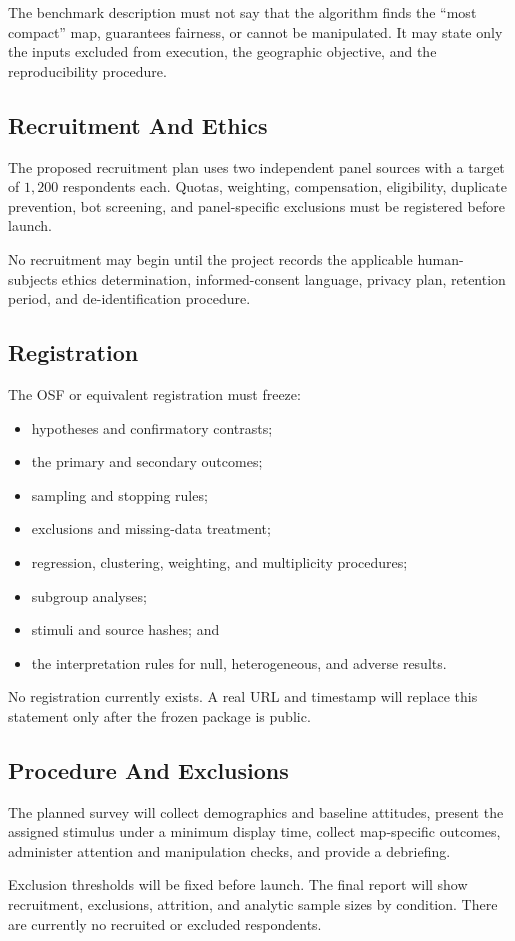 The benchmark description must not say that the algorithm finds the ``most
compact'' map, guarantees fairness, or cannot be manipulated. It may state only
the inputs excluded from execution, the geographic objective, and the
reproducibility procedure.

\subsection{Recruitment And Ethics}

The proposed recruitment plan uses two independent panel sources with a target
of $1{,}200$ respondents each. Quotas, weighting, compensation, eligibility,
duplicate prevention, bot screening, and panel-specific exclusions must be
registered before launch.

No recruitment may begin until the project records the applicable
human-subjects ethics determination, informed-consent language, privacy plan,
retention period, and de-identification procedure.

\subsection{Registration}

The OSF or equivalent registration must freeze:

\begin{itemize}
\item hypotheses and confirmatory contrasts;
\item the primary and secondary outcomes;
\item sampling and stopping rules;
\item exclusions and missing-data treatment;
\item regression, clustering, weighting, and multiplicity procedures;
\item subgroup analyses;
\item stimuli and source hashes; and
\item the interpretation rules for null, heterogeneous, and adverse results.
\end{itemize}

No registration currently exists. A real URL and timestamp will replace this
statement only after the frozen package is public.

\subsection{Procedure And Exclusions}

The planned survey will collect demographics and baseline attitudes, present
the assigned stimulus under a minimum display time, collect map-specific
outcomes, administer attention and manipulation checks, and provide a
debriefing.

Exclusion thresholds will be fixed before launch. The final report will show
recruitment, exclusions, attrition, and analytic sample sizes by condition.
There are currently no recruited or excluded respondents.
